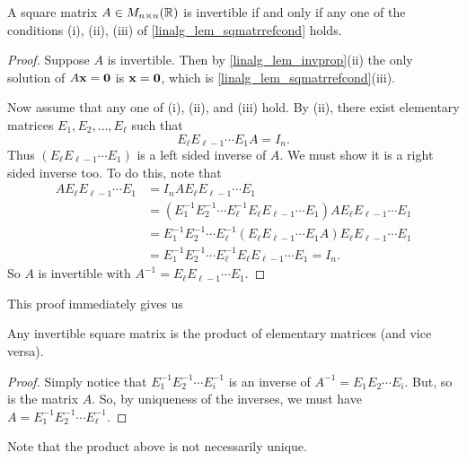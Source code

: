\documentclass[10pt, a4paper]{article}
\begin{document}
\begin{theorem}\label{linalg_thm_fundthmofinvertmatr}
    A square matrix $A \in M_{n \times n}(\mathbb{R})$ is invertible if and only if any one of the conditions (i), (ii), (iii) of \autoref{linalg_lem_sqmatrrefcond} holds.
    \begin{proof}
        Suppose $A$ is invertible.
        Then by \autoref{linalg_lem_invprop}(ii) the only solution of $A\mathbf{x} = \mathbf{0}$ is $\mathbf{x} = \mathbf{0}$,
        which is \autoref{linalg_lem_sqmatrrefcond}(iii).

        Now assume that any one of (i), (ii), and (iii) hold.
        By (ii), there exist elementary matrices $E_1, E_2, \dotsc, E_\ell$ such that
        \[
        E_\ell E_{\ell - 1} \dotsi E_1 A = I_n.
        \]
        Thus $(E_\ell E_{\ell - 1} \dotsi E_1)$ is a left sided inverse of $A$.
        We must show it is a right sided inverse too.
        To do this, note that
        \begin{align*}
            AE_\ell E_{\ell - 1} \dotsi E_1 &= I_n A E_\ell E_{\ell - 1} \dotsi E_1 \\
            &= (E_1 ^ {-1} E_2 ^ {-1} \dotsi E_{\ell} ^ {-1}E_\ell E_{\ell - 1} \dotsi E_1)AE_\ell E_{\ell - 1} \dotsi E_1 \\
            &= E_1 ^ {-1} E_2 ^ {-1} \dotsi E_{\ell} ^ {-1}(E_\ell E_{\ell - 1} \dotsi E_1A)E_\ell E_{\ell - 1} \dotsi E_1 \\
            &= E_1 ^ {-1} E_2 ^ {-1} \dotsi E_{\ell} ^ {-1}E_\ell E_{\ell - 1} \dotsi E_1 = I_n.
        \end{align*}
        So $A$ is invertible with $A ^ {-1} = E_\ell E_{\ell - 1} \dotsi E_1$.
    \end{proof}
\end{theorem}
This proof immediately gives us
\begin{corollary}\label{pre_linalg_col_invisprodofele}
    Any invertible square matrix is the product of elementary matrices (and vice versa).
    \begin{proof}
        Simply notice that $E_1 ^ {-1}E_2 ^ {-1} \dotsi E_i ^ {-1}$ is an inverse of $A ^ {-1} = E_1E_2 \dotsi E_i$.
        But, so is the matrix $A$.
        So, by uniqueness of the inverses,
        we must have $A = E_1 ^ {-1} E_2 ^ {-1} \dotsi E_\ell ^ {-1}$.
    \end{proof}
\end{corollary}

\begin{remark}
    Note that the product above is not necessarily unique.
\end{remark}
\end{document}
